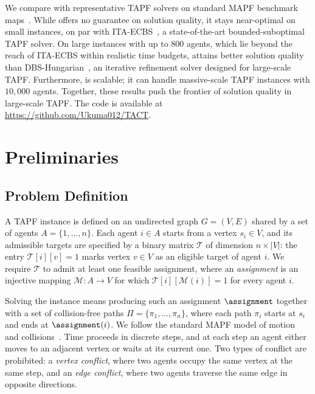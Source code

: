 We compare \planner with representative TAPF solvers on standard MAPF benchmark maps~\cite{stern2019def}.
While \planner offers no guarantee on solution quality, it stays near-optimal on small instances, on par with ITA-ECBS~\cite{tang2024ita-ecbs}, a state-of-the-art bounded-suboptimal TAPF solver.
On large instances with up to 800 agents, which lie beyond the reach of ITA-ECBS within realistic time budgets, \planner attains better solution quality than DBS-Hungarian~\cite{kumagai2026alternating}, an iterative refinement solver designed for large-scale TAPF.
Furthermore, \planner is scalable; it can handle massive-scale TAPF instances with $10{,}000$ agents.
Together, these results push the frontier of solution quality in large-scale TAPF.
The code is available at \url{https://github.com/Ukuma012/TACT}.

\section{Preliminaries}
\subsection{Problem Definition}
A TAPF instance is defined on an undirected graph $G=(V, E)$ shared by a set of agents $A=\{1, \ldots, n\}$.
Each agent $i \in A$ starts from a vertex $s_i \in V$, and its admissible targets are specified by a binary matrix $\mathcal{T}$ of dimension $n \times |V|$: the entry $\mathcal{T}[i][v] = 1$ marks vertex $v \in V$ as an eligible target of agent $i$.
We require $\mathcal{T}$ to admit at least one feasible assignment, where an \emph{assignment} is an injective mapping $\mathcal{M}: A \to V$ for which $\mathcal{T}[i][\mathcal{M}(i)] = 1$ for every agent $i$.

Solving the instance means producing such an assignment $\assignment$ together with a set of collision-free paths $\Pi = \{\pi_1, \ldots, \pi_n\}$, where each path $\pi_i$ starts at $s_i$ and ends at $\assignment(i)$.
We follow the standard MAPF model of motion and collisions~\cite{stern2019def}.
Time proceeds in discrete steps, and at each step an agent either moves to an adjacent vertex or waits at its current one.
Two types of conflict are prohibited: a \emph{vertex conflict}, where two agents occupy the same vertex at the same step, and an \emph{edge conflict}, where two agents traverse the same edge in opposite directions.

